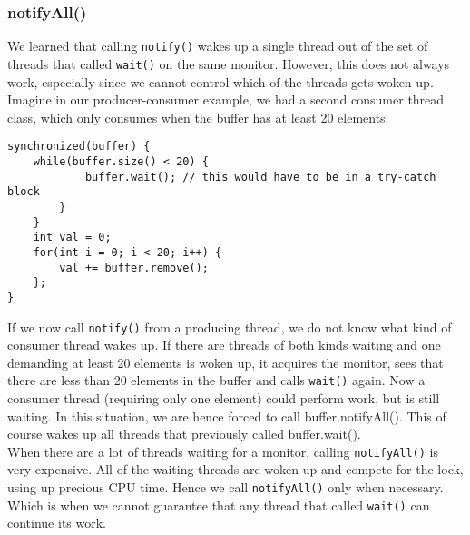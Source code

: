 \documentclass[main.tex]{subfiles}
\begin{document}
\subsubsection{notifyAll()}
We learned that calling \texttt{notify()} wakes up a single thread out of the set of threads that called \texttt{wait()} on the same monitor. However, this does not always work, especially since we cannot control which of the threads gets woken up. Imagine in our producer-consumer example, we had a second consumer thread class, which only consumes when the buffer has at least 20 elements:
\begin{verbatim}
synchronized(buffer) {
    while(buffer.size() < 20) {
            buffer.wait(); // this would have to be in a try-catch block
        }
    }
    int val = 0;
    for(int i = 0; i < 20; i++) {
        val += buffer.remove();
    };
}
\end{verbatim}
If we now call \texttt{notify()} from a producing thread, we do not know what kind of consumer thread wakes up. If there are threads of both kinds waiting and one demanding at least 20 elements is woken up, it acquires the monitor, sees that there are less than 20 elements in the buffer and calls \texttt{wait()} again. Now a consumer thread (requiring only one element) could perform work, but is still waiting. In this situation, we are hence forced to call buffer.notifyAll(). This of course wakes up all threads that previously called buffer.wait().\\
When there are a lot of threads waiting for a monitor, calling \texttt{notifyAll()} is very expensive. All of the waiting threads are woken up and compete for the lock, using up precious CPU time. Hence we call \texttt{notifyAll()} only when necessary. Which is when we cannot guarantee that any thread that called \texttt{wait()} can continue its work.
\end{document}
